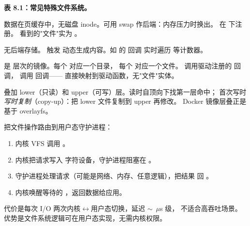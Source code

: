 \begin{filesystemlayout}
{\par\noindent\textbf{表 8.1：常见特殊文件系统。}\par}


数据在页缓存中，无磁盘 inode。可用 swap 作后端：内存压力时换出。
 在  下注册。
 看到的"文件"实为 。


 无后端存储。 触发 
动态生成内容。如  的  回调
 实时遍历  等计数器。


 是  层次的镜像。每个  对应一个目录，
每个  对应一个文件。 调用驱动注册的
 回调， 调用  回调——
直接映射到驱动函数，无"文件"实体。


叠加 lower（只读）和 upper（可写）层。读时自顶向下找第一层命中；
首次写时\emph{写时复制}（copy-up）：把 lower 文件复制到 upper 再修改。
Docker 镜像层叠正是基于 overlayfs。


 把文件操作路由到用户态守护进程：

\begin{enumerate}\tightlist
\item 内核 VFS 调用 。
\item 内核把请求写入  字符设备，守护进程阻塞在 。
\item 守护进程处理请求（可能是网络、内存、任意逻辑），把结果  回 。
\item 内核唤醒等待的 ，返回数据给应用。
\end{enumerate}

代价是每次 I/O 两次内核$\leftrightarrow$用户态切换，延迟 $\sim$~$\mu$s 级，
不适合高吞吐场景。优势是文件系统逻辑可在用户态实现，无需内核权限。


\end{filesystemlayout}
